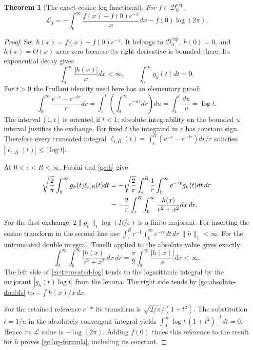 \documentclass[11pt]{article}
\newtheorem{theorem}{Theorem}
\begin{document}
\begin{theorem}[The exact cosine-log functional]
For $f\in\mathcal D_0^{\exp}$,
\begin{equation}
 \boxed{\displaystyle
 \mathscr L_f=-\int_0^\infty\frac{f(x)-f(0)e^{-x}}{x}dx
                      -f(0)\log(2\pi).}
 \label{gc:log-formula}
\end{equation}
\end{theorem}
\begin{proof}
Set $h(x)=f(x)-f(0)e^{-x}$.  It belongs to $\mathcal D_0^{\exp}$,
$h(0)=0$, and $h(x)=O(x)$ near zero because its right derivative is
bounded there.  Its exponential decay gives
\begin{equation}
 \int_0^\infty\frac{|h(x)|}{x}dx<\infty,
 \qquad \int_0^\infty g_h(t)dt=0.
 \label{gc:h}
\end{equation}
For $t>0$ the Frullani identity used here has an elementary proof:
\begin{equation}
 \int_0^\infty\frac{e^{-r}-e^{-tr}}{r}dr
 =\int_1^t\left(\int_0^\infty e^{-ur}dr\right)du
 =\int_1^t\frac{du}{u}=\log t.
 \label{gc:Frullani}
\end{equation}
The interval $[1,t]$ is oriented if $t<1$; absolute integrability on the
bounded $u$ interval justifies the exchange.  For fixed $t$ the integrand
in $r$ has constant sign.  Therefore every truncated integral
$\ell_{\epsilon,R}(t)=\int_\epsilon^R(e^{-r}-e^{-tr})dr/r$
satisfies $|\ell_{\epsilon,R}(t)|\le|\log t|$.

At $0<\epsilon<R<\infty$, Fubini and \eqref{gc:h} give
\begin{align}
 \sqrt{\frac2\pi}\int_0^\infty g_h(t)\ell_{\epsilon,R}(t)dt
 &=-\sqrt{\frac2\pi}\int_\epsilon^R\frac1r
                        \int_0^\infty e^{-rt}g_h(t)dt\,dr\notag\\
 &=-\frac2\pi\int_\epsilon^R\int_0^\infty
                           \frac{h(x)}{r^2+x^2}dx\,dr.
 \label{gc:truncated-log}
\end{align}
For the first exchange, $2\|g_h\|_1\log(R/\epsilon)$ is a finite
majorant.  For inserting the cosine transform in the second line use
$\int_\epsilon^R r^{-1}\int_0^\infty e^{-rt}dt\,dr\,\|h\|_1<\infty$.
For the untruncated double integral, Tonelli applied to the absolute value
gives exactly
\begin{equation}
 \int_0^\infty\int_0^\infty\frac{|h(x)|}{r^2+x^2}dx\,dr
   =\frac\pi2\int_0^\infty\frac{|h(x)|}{x}dx<\infty.
 \label{gc:absolute-double}
\end{equation}
The left side of \eqref{gc:truncated-log} tends to the logarithmic
integral by the majorant $|g_h(t)\log t|$ from the lemma.  The right side
tends by \eqref{gc:absolute-double} to $-\int h(x)/x\,dx$.

For the retained reference $e^{-x}$ its transform is
$\sqrt{2/\pi}/(1+t^2)$.  The substitution $t=1/u$ in the absolutely
convergent integral yields
$\int_0^\infty\log t\,(1+t^2)^{-1}dt=0$.
Hence its $\mathscr L$ value is $-\log(2\pi)$.
Adding $f(0)$ times this reference to the result for $h$ proves
\eqref{gc:log-formula}, including its constant.
\end{proof}
\end{document}
